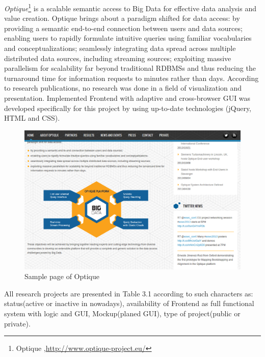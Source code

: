     \emph{Optique}\footnote{Optique ,\url{http://www.optique-project.eu/}} is a scalable semantic access to Big Data for effective data analysis and value creation. Optique brings about a paradigm shifted for data access: by providing a semantic end-to-end connection between users and data sources; enabling users to rapidly formulate intuitive queries using familiar vocabularies and conceptualizations; seamlessly integrating data spread across multiple distributed data sources, including streaming sources; exploiting massive parallelism for scalability far beyond traditional RDBMSs and thus reducing the turnaround time for information requests to minutes rather than days\cite{calvanese-etal-JAIR-2013-explanation,ernestojimenezruizbernardocuencagrau2013ontology,DBLP:conf/dlog/MollerNOW13ohneCross}. According to research publications, no research was done in a field of visualization and presentation. Implemented Frontend with adaptive and cross-browser GUI was developed specifically for this project by using up-to-date technologies (jQuery, HTML and CSS).
    \begin{figure}[!ht]
		\centering
		\includegraphics[scale=0.5]{Material/examples/Optique.png}   
		\caption[Sample page of Optique]{Sample page of Optique}                  
		\end{figure} 

    All research projects are presented in Table 3.1 according to such characters as: status(active or inactive in nowadays), availability of Frontend as full functional system with logic and GUI, Mockup(planed GUI), type of project(public or private).

